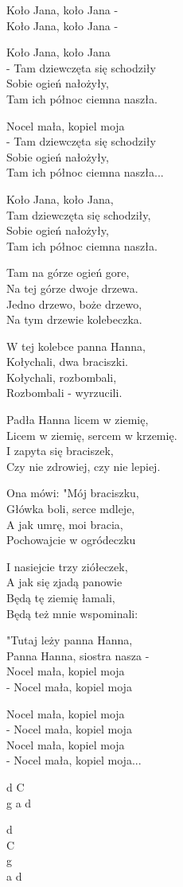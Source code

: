\begin{text}
    Koło Jana, koło Jana -\\
    Koło Jana, koło Jana -

    Koło Jana, koło Jana\\
    - Tam dziewczęta się schodziły\\
    Sobie ogień nałożyły,\\
    Tam ich północ ciemna naszła.

    Nocel mała, kopiel moja\\
    - Tam dziewczęta się schodziły\\
    Sobie ogień nałożyły,\\
    Tam ich północ ciemna naszła...

    Koło Jana, koło Jana,\\
    Tam dziewczęta się schodziły,\\
    Sobie ogień nałożyły,\\
    Tam ich północ ciemna naszła.

    Tam na górze ogień gore,\\
    Na tej górze dwoje drzewa.\\
    Jedno drzewo, boże drzewo,\\
    Na tym drzewie kolebeczka.

    W tej kolebce panna Hanna,\\
    Kołychali, dwa braciszki.\\
    Kołychali, rozbombali,\\
    Rozbombali - wyrzucili.

    Padła Hanna licem w ziemię,\\
    Licem w ziemię, sercem w krzemię.\\
    I zapyta się braciszek,\\
    Czy nie zdrowiej, czy nie lepiej.

    Ona mówi: "Mój braciszku,\\
    Główka boli, serce mdleje,\\
    A jak umrę, moi bracia,\\
    Pochowajcie w ogródeczku

    I nasiejcie trzy ziółeczek,\\
    A jak się zjadą panowie\\
    Będą tę ziemię łamali,\\
    Będą też mnie wspominali:

    "Tutaj leży panna Hanna,\\
    Panna Hanna, siostra nasza -\\
    Nocel mała, kopiel moja\\
    - Nocel mała, kopiel moja

    Nocel mała, kopiel moja\\
    - Nocel mała, kopiel moja\\
    Nocel mała, kopiel moja\\
    - Nocel mała, kopiel moja...
\end{text}
\begin{chord}
    d C\\
    g a d

    d\\
    C\\
    g\\
    a d
\end{chord}